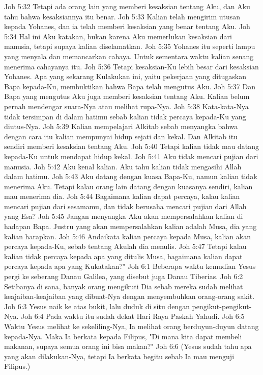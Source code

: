 Joh 5:32  Tetapi ada orang lain yang memberi kesaksian tentang Aku, dan Aku tahu bahwa kesaksiannya itu benar.
Joh 5:33  Kalian telah mengirim utusan kepada Yohanes, dan ia telah memberi kesaksian yang benar tentang Aku.
Joh 5:34  Hal ini Aku katakan, bukan karena Aku memerlukan kesaksian dari manusia, tetapi supaya kalian diselamatkan.
Joh 5:35  Yohanes itu seperti lampu yang menyala dan memancarkan cahaya. Untuk sementara waktu kalian senang menerima cahayanya itu.
Joh 5:36  Tetapi kesaksian-Ku lebih besar dari kesaksian Yohanes. Apa yang sekarang Kulakukan ini, yaitu pekerjaan yang ditugaskan Bapa kepada-Ku, membuktikan bahwa Bapa telah mengutus Aku.
Joh 5:37  Dan Bapa yang mengutus Aku juga memberi kesaksian tentang Aku. Kalian belum pernah mendengar suara-Nya atau melihat rupa-Nya.
Joh 5:38  Kata-kata-Nya tidak tersimpan di dalam hatimu sebab kalian tidak percaya kepada-Ku yang diutus-Nya.
Joh 5:39  Kalian mempelajari Alkitab sebab menyangka bahwa dengan cara itu kalian mempunyai hidup sejati dan kekal. Dan Alkitab itu sendiri memberi kesaksian tentang Aku.
Joh 5:40  Tetapi kalian tidak mau datang kepada-Ku untuk mendapat hidup kekal.
Joh 5:41  Aku tidak mencari pujian dari manusia.
Joh 5:42  Aku kenal kalian. Aku tahu kalian tidak mengasihi Allah dalam hatimu.
Joh 5:43  Aku datang dengan kuasa Bapa-Ku, namun kalian tidak menerima Aku. Tetapi kalau orang lain datang dengan kuasanya sendiri, kalian mau menerima dia.
Joh 5:44  Bagaimana kalian dapat percaya, kalau kalian mencari pujian dari sesamamu, dan tidak berusaha mencari pujian dari Allah yang Esa?
Joh 5:45  Jangan menyangka Aku akan mempersalahkan kalian di hadapan Bapa. Justru yang akan mempersalahkan kalian adalah Musa, dia yang kalian harapkan.
Joh 5:46  Andaikata kalian percaya kepada Musa, kalian akan percaya kepada-Ku, sebab tentang Akulah dia menulis.
Joh 5:47  Tetapi kalau kalian tidak percaya kepada apa yang ditulis Musa, bagaimana kalian dapat percaya kepada apa yang Kukatakan?"
Joh 6:1  Beberapa waktu kemudian Yesus pergi ke seberang Danau Galilea, yang disebut juga Danau Tiberias.
Joh 6:2  Setibanya di sana, banyak orang mengikuti Dia sebab mereka sudah melihat keajaiban-keajaiban yang dibuat-Nya dengan menyembuhkan orang-orang sakit.
Joh 6:3  Yesus naik ke atas bukit, lalu duduk di situ dengan pengikut-pengikut-Nya.
Joh 6:4  Pada waktu itu sudah dekat Hari Raya Paskah Yahudi.
Joh 6:5  Waktu Yesus melihat ke sekeliling-Nya, Ia melihat orang berduyun-duyun datang kepada-Nya. Maka Ia berkata kepada Filipus, "Di mana kita dapat membeli makanan, supaya semua orang ini bisa makan?"
Joh 6:6  (Yesus sudah tahu apa yang akan dilakukan-Nya, tetapi Ia berkata begitu sebab Ia mau menguji Filipus.)
